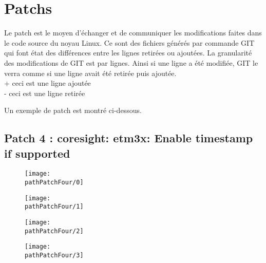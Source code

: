 
\chapter*{Patchs}

Le patch est le moyen d'échanger et de communiquer les modifications faites
dans le code source du noyau Linux. Ce sont des fichiers générés par commande
GIT qui font état des différences entre les lignes retirées ou ajoutées.  La
granularité des modifications de GIT est par lignes. Ainsi si une ligne a été
modifiée, GIT le verra comme si une ligne avait été retirée puis ajoutée.  \\

\noindent
+ ceci est une ligne ajoutée \\
- ceci est une ligne retirée

Un exemple de patch est montré ci-dessous.\\

\section*{Patch 4 : coresight: etm3x: Enable timestamp if supported}
\begin{figure}[H]
	\begin{center}
		\texttt{[image: \\pathPatchFour/0]}
	\end{center}
\end{figure}

\begin{figure}[H]
	\begin{center}
		\texttt{[image: \\pathPatchFour/1]}
	\end{center}
\end{figure}

\begin{figure}[H]
	\begin{center}
		\texttt{[image: \\pathPatchFour/2]}
	\end{center}
\end{figure}

\begin{figure}[H]
	\begin{center}
		\texttt{[image: \\pathPatchFour/3]}
	\end{center}
\end{figure}
